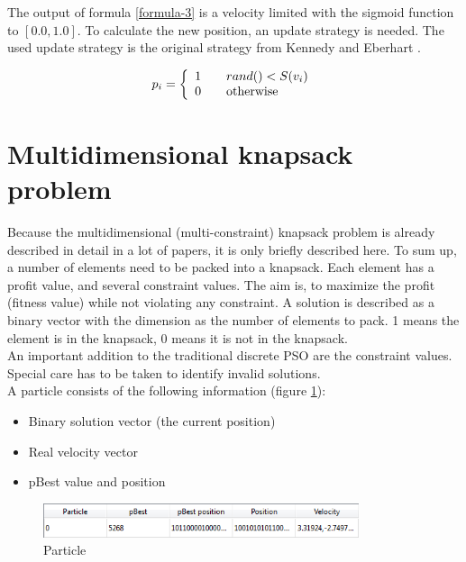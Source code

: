 \documentclass{article}
\begin{document}
The output of formula \ref{formula-3} is a velocity limited with the sigmoid function to $[0.0, 1.0]$. To calculate the new position, an update strategy is needed. The used update strategy is the original strategy from Kennedy and Eberhart \cite{bib-discrete}.

\begin{equation}
p_i = \left\{ 
\begin{array}{l l}
  1 & \quad \text{$rand() < S(v_i)$}\\
  0 & \quad \text{otherwise}
\end{array} \right.
\end{equation}


\section{Multidimensional knapsack problem}
\label{lbl-mknap}
Because the multidimensional (multi-constraint) knapsack problem is already described in detail in a lot of papers, it is only briefly described here. To sum up, a number of elements need to be packed into a knapsack. Each element has a profit value, and several constraint values. The aim is, to maximize the profit (fitness value) while not violating any constraint. A solution is described as a binary vector with the dimension as the number of elements to pack. 1 means the element is in the knapsack, 0 means it is not in the knapsack. \\ An important addition to the traditional discrete PSO are the constraint values. Special care has to be taken to identify invalid solutions.\\

A particle consists of the following information (figure \ref{fig-particle}):
\begin{itemize}
\item Binary solution vector (the current position)
\item Real velocity vector
\item pBest value and position
\end{itemize}

\begin{figure}[H]
    \centering
    \includegraphics[width=350px]{images/particle.PNG}
    \caption{Particle}
    \label{fig-particle}
\end{figure}
\end{document}
